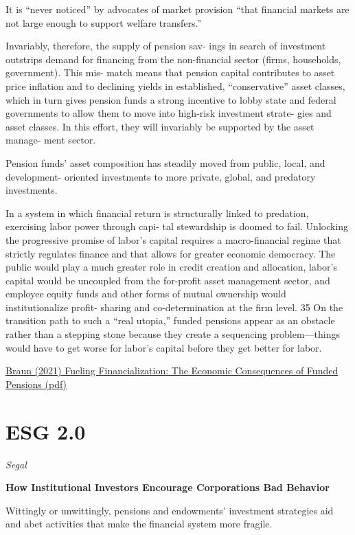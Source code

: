\documentclass[
]{book}
\begin{document}
It is ``never noticed'' by advocates
of market provision ``that financial markets are
not large enough to support welfare transfers.''

Invariably, therefore, the supply of pension sav-
ings in search of investment outstrips demand
for financing from the non-financial sector
(firms, households, government). This mis-
match means that pension capital contributes to
asset price inflation and to declining yields in
established, ``conservative'' asset classes, which
in turn gives pension funds a strong incentive to
lobby state and federal governments to allow
them to move into high-risk investment strate-
gies and asset classes. In this effort, they will
invariably be supported by the asset manage-
ment sector.

Pension funds' asset composition has steadily
moved from public, local, and development-
oriented investments to more private, global,
and predatory investments.

In a system in
which financial return is structurally linked to
predation, exercising labor power through capi-
tal stewardship is doomed to fail. Unlocking the
progressive promise of labor's capital requires
a macro-financial regime that strictly regulates
finance and that allows for greater economic
democracy. The public would play a much
greater role in credit creation and allocation,
labor's capital would be uncoupled from
the for-profit asset management sector, and
employee equity funds and other forms of
mutual ownership would institutionalize profit-
sharing and co-determination at the firm level. 35
On the transition path to such a ``real utopia,''
funded pensions appear as an obstacle rather
than a stepping stone because they create a
sequencing problem---things would have to get
worse for labor's capital before they get better
for labor.

\href{pdf/Braun_2021_Fueling_Financialization_Funded_Pensions.pdf}{Braun (2021) Fueling Financialization: The Economic Consequences of Funded Pensions (pdf)}

\hypertarget{esg-2.0-1}{%
\section{ESG 2.0}\label{esg-2.0-1}}

\emph{Segal}

\textbf{How Institutional Investors Encourage Corporations Bad Behavior}

Wittingly or unwittingly, pensions and endowments' investment strategies aid and abet activities that make the financial system more fragile.
\end{document}
